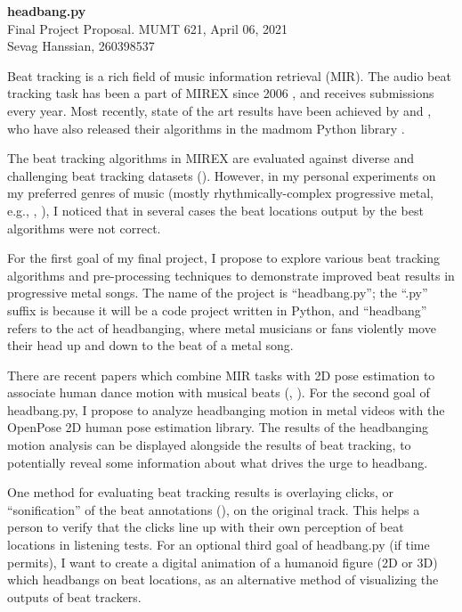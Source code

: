 \documentclass[letter,12pt]{report}
\begin{document}
\Large{\textbf{headbang.py}}\\
\large{Final Project Proposal. MUMT 621, April 06, 2021}\\
\large{Sevag Hanssian, 260398537}

\vspace{2em}

Beat tracking is a rich field of music information retrieval (MIR). The audio beat tracking task has been a part of MIREX since 2006 \cite{mirex06}, and receives submissions every year. Most recently, state of the art results have been achieved by \cite{bock1} and \cite{bock2}, who have also released their algorithms in the madmom Python library \cite{madmom}.

\vspace{1em}

\qquad The beat tracking algorithms in MIREX are evaluated against diverse and challenging beat tracking datasets (\cite{beatmeta}). However, in my personal experiments on my preferred genres of music (mostly rhythmically-complex progressive metal, e.g., \cite{meshuggah}, \cite{periphery}), I noticed that in several cases the beat locations output by the best algorithms were not correct.

\vspace{1em}

\qquad For the first goal of my final project, I propose to explore various beat tracking algorithms and pre-processing techniques to demonstrate improved beat results in progressive metal songs. The name of the project is ``headbang.py''; the ``.py'' suffix is because it will be a code project written in Python, and ``headbang'' refers to the act of headbanging, where metal musicians or fans violently move their head up and down to the beat of a metal song.

\vspace{1em}

\qquad There are recent papers which combine MIR tasks with 2D pose estimation to associate human dance motion with musical beats (\cite{pose1}, \cite{pose2}). For the second goal of headbang.py, I propose to analyze headbanging motion in metal videos with the OpenPose 2D human pose estimation library. The results of the headbanging motion analysis can be displayed alongside the results of beat tracking, to potentially reveal some information about what drives the urge to headbang.

\vspace{1em}

\qquad One method for evaluating beat tracking results is overlaying clicks, or ``sonification'' of the beat annotations (\cite{clicks}), on the original track. This helps a person to verify that the clicks line up with their own perception of beat locations in listening tests. For an optional third goal of headbang.py (if time permits), I want to create a digital animation of a humanoid figure (2D or 3D) which headbangs on beat locations, as an alternative method of visualizing the outputs of beat trackers.

\vfill
\clearpage

\printbibheading[title={\vspace{-3.5em}References},heading=bibnumbered]
\vspace{-1.5em}
\printbibliography[heading=none]
\end{document}

